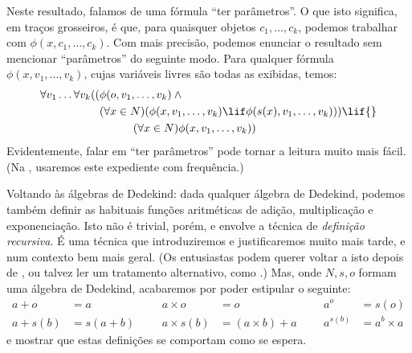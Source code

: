 \documentclass[../../../include/open-logic-section]{subfiles}
\begin{document}
Neste resultado, falamos de uma fórmula ``ter parâmetros''. O que isto
significa, em traços grosseiros, é que, para quaisquer objetos $c_1, \ldots, c_k$, podemos
trabalhar com $\phi(x, c_1, \ldots, c_k)$. Com mais precisão, podemos enunciar
o resultado sem mencionar ``parâmetros'' do seguinte modo. Para qualquer
fórmula $\phi(x, v_1, \ldots, v_k)$, cujas variáveis livres são todas as
exibidas, temos:
	\begin{align*}
			\forall v_1 \ldots \forall v_k((&\phi(o, v_1,\ldots, v_k) \land {}\\
			&	(\forall x \in N)(\phi(x,v_1, \ldots, v_k) \lif \phi(s(x), v_1,\ldots, v_k))) \lif {}\\
			&\hspace{3em} (\forall x \in N)\phi(x, v_1,\ldots, v_k))
	\end{align*}
Evidentemente, falar em ``ter parâmetros'' pode tornar a leitura muito
mais fácil. (Na , usaremos este expediente com
frequência.)

Voltando às álgebras de Dedekind: dada qualquer álgebra de Dedekind, podemos
também definir as habituais funções aritméticas de adição,
multiplicação e exponenciação. Isto não é trivial, porém, e envolve a
técnica de \emph{definição recursiva}. É uma técnica que introduziremos e
justificaremos muito mais tarde, e num contexto bem mais geral. (Os entusiastas
podem querer voltar a isto depois de , ou
talvez ler um tratamento alternativo, como \citealt[pp.~95--8]{Potter2004}.) Mas,
onde $N, s, o$ formam uma álgebra de Dedekind, acabaremos por poder estipular o
seguinte:
\begin{align*}
	{a} + {o} &= {a} & & & {a} \times {o} &= {o} & & & {a}^{o} &= s(o)\\
{a} + {s}({b}) &= {s}({a}+{b}) &&& {a} \times {s}({b}) &= ({a}\times {b}) + {a}  & & & {a}^{{s}({b})} &= {a}^{b} \times {a}
\end{align*}
e mostrar que estas definições se comportam como se espera.
\end{document}
